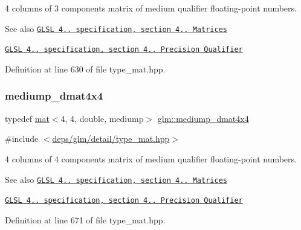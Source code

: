 4 columns of 3 components matrix of medium qualifier floating-\/point numbers.

\begin{DoxySeeAlso}{See also}
\href{http://www.opengl.org/registry/doc/GLSLangSpec.4.20.8.pdf}{\tt G\+L\+SL 4.. specification, section 4.. Matrices} 

\href{http://www.opengl.org/registry/doc/GLSLangSpec.4.20.8.pdf}{\tt G\+L\+SL 4.. specification, section 4.. Precision Qualifier} 
\end{DoxySeeAlso}


Definition at line 630 of file type\+\_\+mat.\+hpp.

\mbox{\label{group__core__precision_ga53d2b544e1cf6812ed3b2f152d16a770}} 
\subsubsection{\texorpdfstring{mediump\+\_\+dmat4x4}{mediump\_dmat4x4}}
{\footnotesize\ttfamily typedef \hyperlink{structglm_1_1mat}{mat}$<$4, 4, double, mediump$>$ \hyperlink{group__core__precision_ga53d2b544e1cf6812ed3b2f152d16a770}{glm\+::mediump\+\_\+dmat4x4}}



{\ttfamily \#include $<$\hyperlink{type__mat_8hpp}{deps/glm/detail/type\+\_\+mat.\+hpp}$>$}

4 columns of 4 components matrix of medium qualifier floating-\/point numbers.

\begin{DoxySeeAlso}{See also}
\href{http://www.opengl.org/registry/doc/GLSLangSpec.4.20.8.pdf}{\tt G\+L\+SL 4.. specification, section 4.. Matrices} 

\href{http://www.opengl.org/registry/doc/GLSLangSpec.4.20.8.pdf}{\tt G\+L\+SL 4.. specification, section 4.. Precision Qualifier} 
\end{DoxySeeAlso}


Definition at line 671 of file type\+\_\+mat.\+hpp.

\mbox{\label{group__core__precision_ga71307e1aa231cbc5d9de712a92714496}} 

